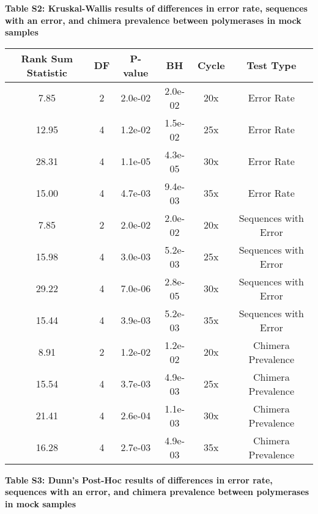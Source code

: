 \documentclass[11pt,]{article}
\begin{document}
\newpage

\textbf{Table S2: Kruskal-Wallis results of differences in error rate,
sequences with an error, and chimera prevalence between polymerases in
mock samples}

\begin{longtable}[]{@{}cccccc@{}}
\toprule
Rank Sum Statistic & DF & P-value & BH & Cycle & Test
Type\tabularnewline
\midrule
\endhead
7.85 & 2 & 2.0e-02 & 2.0e-02 & 20x & Error Rate\tabularnewline
12.95 & 4 & 1.2e-02 & 1.5e-02 & 25x & Error Rate\tabularnewline
28.31 & 4 & 1.1e-05 & 4.3e-05 & 30x & Error Rate\tabularnewline
15.00 & 4 & 4.7e-03 & 9.4e-03 & 35x & Error Rate\tabularnewline
7.85 & 2 & 2.0e-02 & 2.0e-02 & 20x & Sequences with Error\tabularnewline
15.98 & 4 & 3.0e-03 & 5.2e-03 & 25x & Sequences with
Error\tabularnewline
29.22 & 4 & 7.0e-06 & 2.8e-05 & 30x & Sequences with
Error\tabularnewline
15.44 & 4 & 3.9e-03 & 5.2e-03 & 35x & Sequences with
Error\tabularnewline
8.91 & 2 & 1.2e-02 & 1.2e-02 & 20x & Chimera Prevalence\tabularnewline
15.54 & 4 & 3.7e-03 & 4.9e-03 & 25x & Chimera Prevalence\tabularnewline
21.41 & 4 & 2.6e-04 & 1.1e-03 & 30x & Chimera Prevalence\tabularnewline
16.28 & 4 & 2.7e-03 & 4.9e-03 & 35x & Chimera Prevalence\tabularnewline
\bottomrule
\end{longtable}

\newpage

\textbf{Table S3: Dunn's Post-Hoc results of differences in error rate,
sequences with an error, and chimera prevalence between polymerases in
mock samples}
\end{document}
